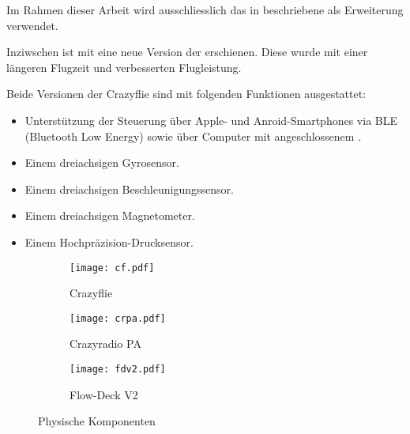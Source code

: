 Im Rahmen dieser Arbeit wird ausschliesslich das in  beschriebene  als Erweiterung verwendet.

Inziwschen ist mit  eine neue Version der erschienen.
Diese wurde mit einer längeren Flugzeit und verbesserten Flugleistung. 

Beide Versionen der Crazyflie sind mit folgenden Funktionen ausgestattet:

\begin{itemize}
    \item Unterstützung der Steuerung über Apple- und Anroid-Smartphones via BLE (Bluetooth Low Energy) sowie über Computer mit angeschlossenem .
    \item Einem dreiachsigen Gyrosensor.\footnotemark
    \item Einem dreiachsigen Beschleunigungssensor.\footnotemark[\value{footnote}]
    \item Einem dreiachsigen Magnetometer.\footnotemark[\value{footnote}]
    \item Einem Hochpräzision-Drucksensor.
\end{itemize}


\begin{figure}[H]
    \centering
    \begin{imgbox}
        \begin{subfigure}[b]{0.3\textwidth}
            \centering
            \texttt{[image: cf.pdf]}
            \caption{Crazyflie  \cite{bc:cf20}}
            \label{pic:cf20}
        \end{subfigure}
        \hfill
        \begin{subfigure}[b]{0.3\textwidth}
            \centering
            \texttt{[image: crpa.pdf]}
            \caption{Crazyradio PA \cite{bc:crpa}}
            \label{pic:crpa}
        \end{subfigure}
        \hfill
        \begin{subfigure}[b]{0.3\textwidth}
            \centering
            \texttt{[image: fdv2.pdf]}
            \caption{Flow-Deck V2 \cite{bc:fdv2}}
            \label{pic:fdv2}
        \end{subfigure}
    \end{imgbox}
    \caption{Physische Komponenten}
        \label{fig:drohne_und_radio}
\end{figure}

